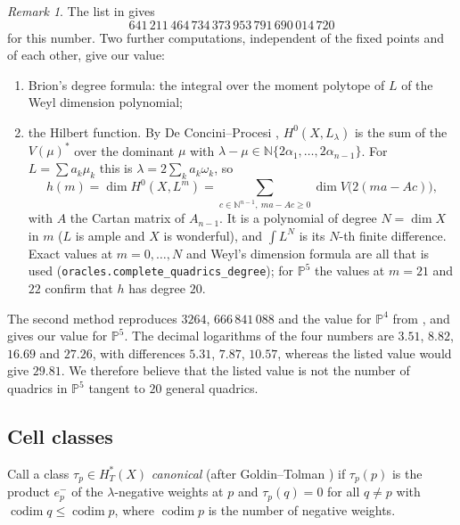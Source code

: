 \documentclass[11pt]{amsart}
\theoremstyle{definition}
\theoremstyle{remark}
\newtheorem{remark}[theorem]{Remark}
\newcommand{\code}[1]{\texttt{#1}}
\newcommand{\PP}{\mathbb{P}}
\DeclareMathOperator{\codim}{codim}
\begin{document}
\begin{remark}
The list in \cite[Question~5]{Sturmfels3264} gives
\[641\,211\,464\,734\,373\,953\,791\,690\,014\,720\]
for this number. Two further computations, independent of the fixed points
and of each other, give our value:
\begin{enumerate}
\item Brion's degree formula: the integral over the moment polytope of $L$
of the Weyl dimension polynomial;
\item the Hilbert function. By De Concini--Procesi \cite{DCP83},
$H^0(X,L_\lambda)$ is the sum of the $V(\mu)^*$ over the dominant $\mu$ with
$\lambda-\mu\in\mathbb N\{2\alpha_1,\dots,2\alpha_{n-1}\}$. For $L=\sum a_k\mu_k$
this is $\lambda = 2\sum_k a_k\omega_k$, so
\[
h(m)=\dim H^0(X,L^m)=\sum_{c\in\mathbb N^{n-1},\ ma-Ac\ge0}\dim V\bigl(2(ma-Ac)\bigr),
\]
with $A$ the Cartan matrix of $A_{n-1}$. It is a polynomial of degree
$N=\dim X$ in $m$ ($L$ is ample and $X$ is wonderful), and $\int L^N$ is its
$N$-th finite difference. Exact values at $m=0,\dots,N$ and Weyl's
dimension formula are all that is used (\code{oracles.complete\_quadrics\_degree});
for $\PP^5$ the values at $m=21$ and $22$ confirm that $h$ has degree $20$.
\end{enumerate}
The second method reproduces $3264$, $666\,841\,088$ and the value for
$\PP^4$ from \cite{Sturmfels3264}, and gives our value for $\PP^5$. The
decimal logarithms of the four numbers are $3.51$, $8.82$, $16.69$ and
$27.26$, with differences $5.31$, $7.87$, $10.57$, whereas the listed value
would give $29.81$. We therefore believe that the listed value is not the
number of quadrics in $\PP^5$ tangent to $20$ general quadrics.
\end{remark}

\subsection{Cell classes}
Call a class $\tau_p\in H_T^*(X)$ \emph{canonical} (after Goldin--Tolman
\cite{GoldinTolman}) if $\tau_p(p)$ is the product $e^-_p$ of the
$\lambda$-negative weights at $p$ and $\tau_p(q)=0$ for all $q\ne p$ with
$\codim q\le\codim p$, where $\codim p$ is the number of negative weights.
\end{document}
